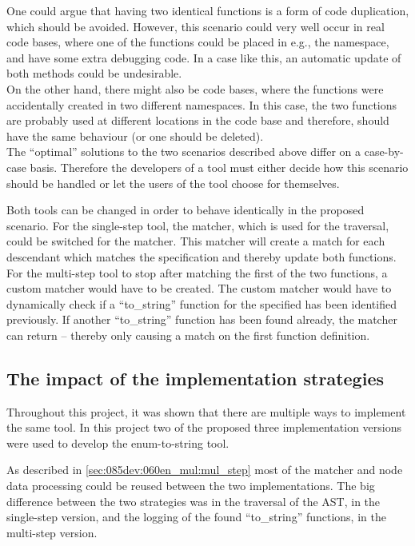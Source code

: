 One could argue that having two identical functions is a form of code duplication, which should be avoided. 
However, this scenario could very well occur in real code bases, where one of the functions could be placed in e.g., the  namespace, and have some extra debugging code. In a case like this, an automatic update of both methods could be undesirable. \\
On the other hand, there might also be code bases, where the functions were accidentally created in two different namespaces. In this case, the two functions are probably used at different locations in the code base and therefore, should have the same behaviour (or one should be deleted).\\
The ``optimal'' solutions to the two scenarios described above differ on a case-by-case basis. Therefore the developers of a tool must either decide how this scenario should be handled or let the users of the tool choose for themselves.

Both tools can be changed in order to behave identically in the proposed scenario. For the single-step tool, the  matcher, which is used for the traversal, could be switched for the  matcher. This matcher will create a match for each descendant which matches the specification and thereby update both functions.\\
For the multi-step tool to stop after matching the first of the two functions, a custom matcher would have to be created. The custom matcher would have to dynamically check if a ``to\_string'' function for the specified  has been identified previously. If another ``to\_string'' function has been found already, the matcher can return  -- thereby only causing a match on the first function definition.


\subsection{The impact of the implementation strategies}

Throughout this project, it was shown that there are multiple ways to implement the same tool. In this project two of the proposed three implementation versions were used to develop the enum-to-string tool. 

As described in \cref{sec:085dev:060en_mul:mul_step} most of the matcher and node data processing could be reused between the two implementations. The big difference between the two strategies was in the traversal of the AST, in the single-step version, and the logging of the found ``to\_string'' functions, in the multi-step version.

